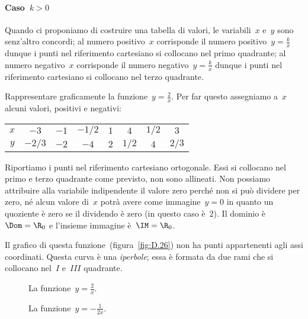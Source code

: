 \paragraph{Caso~\(k>0\)} Quando ci proponiamo di costruire una tabella di 
valori, 
le variabili~\(x\) e~\(y\) sono
senz'altro concordi; al numero positivo~\(x\) corrisponde il numero 
positivo~\(y=\frac{k}{x}\) dunque i punti
nel riferimento cartesiano si collocano nel primo quadrante; al numero 
negativo~\(x\) corrisponde il numero
negativo~\(y=\frac{k}{x}\) dunque i punti nel riferimento cartesiano si 
collocano 
nel terzo quadrante.
 \begin{esempio}
Rappresentare graficamente la funzione~\(y=\frac{2}{x}\).
Per far questo assegniamo a~\(x\) alcuni valori, positivi e negativi:
\begin{center}
 \begin{tabular}{cccccccc}
 \toprule
 \(x\) & \(-3\) & \(-1\) & \(-1/2\) & \(1\) & \(4\)& \(1/2\) & \(3\)\\
 \(y\) & \(-2/3\) & \(-2\) & \(-4\) & \(2\) & \(1/2\)& \(4\) & \(2/3\)\\
 \bottomrule
 \end{tabular}
\end{center}
Riportiamo i punti nel riferimento cartesiano ortogonale. Essi si collocano 
nel 
primo e terzo quadrante come previsto,
non sono allineati. Non possiamo attribuire alla variabile indipendente il 
valore zero perché non si può dividere per zero,
né alcun valore di~\(x\) potrà avere come immagine~\(y=0\) in quanto un 
quoziente è 
zero se il dividendo è zero (in questo caso è~\(2\)).
Il dominio è~\(\Dom=\R_{0}\) e l'insieme immagine è~\(\IM=\R_{0}\).

Il grafico di questa funzione~(figura~\ref{fig:D.26}) non ha punti 
appartenenti 
agli assi coordinati.
Questa curva è una \emph{iperbole}; essa è formata da due rami che si 
collocano 
nel~\(I\) e~\(III\) quadrante.
 \end{esempio}

\begin{inaccessibleblock}
 \begin{figure}[h]
\begin{minipage}[b]{.45\textwidth}
\centering
\caption{La funzione~\(y=\frac{2}{x}\).}\label{fig:D.26}
\end{minipage}\hfil
\begin{minipage}[b]{.45\textwidth}
\centering
\caption{La funzione~\(y=-\frac{1}{2x}\).}\label{fig:D.27}
\end{minipage}
\end{figure}
\end{inaccessibleblock}


